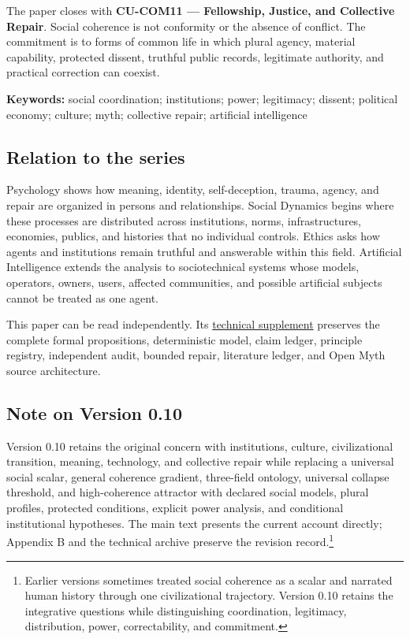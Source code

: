 \documentclass[
  11pt,
]{article}
\begin{document}
The paper closes with \textbf{CU-COM11 --- Fellowship, Justice, and
Collective Repair}. Social coherence is not conformity or the absence of
conflict. The commitment is to forms of common life in which plural
agency, material capability, protected dissent, truthful public records,
legitimate authority, and practical correction can coexist.

\textbf{Keywords:} social coordination; institutions; power; legitimacy;
dissent; political economy; culture; myth; collective repair; artificial
intelligence

\subsection{Relation to the series}\label{relation-to-the-series}

Psychology shows how meaning, identity, self-deception, trauma, agency,
and repair are organized in persons and relationships. Social Dynamics
begins where these processes are distributed across institutions, norms,
infrastructures, economies, publics, and histories that no individual
controls. Ethics asks how agents and institutions remain truthful and
answerable within this field. Artificial Intelligence extends the
analysis to sociotechnical systems whose models, operators, owners,
users, affected communities, and possible artificial subjects cannot be
treated as one agent.

This paper can be read independently. Its
\href{../supplements/07_Social_Dynamics_Technical_Supplement_v0.10.md}{technical
supplement} preserves the complete formal propositions, deterministic
model, claim ledger, principle registry, independent audit, bounded
repair, literature ledger, and Open Myth source architecture.

\subsection{Note on Version 0.10}\label{note-on-version-0.10}

Version 0.10 retains the original concern with institutions, culture,
civilizational transition, meaning, technology, and collective repair
while replacing a universal social scalar, general coherence gradient,
three-field ontology, universal collapse threshold, and high-coherence
attractor with declared social models, plural profiles, protected
conditions, explicit power analysis, and conditional institutional
hypotheses. The main text presents the current account directly;
Appendix B and the technical archive preserve the revision
record.\footnote{Earlier versions sometimes treated social coherence as
  a scalar and narrated human history through one civilizational
  trajectory. Version 0.10 retains the integrative questions while
  distinguishing coordination, legitimacy, distribution, power,
  correctability, and commitment.}
\end{document}
